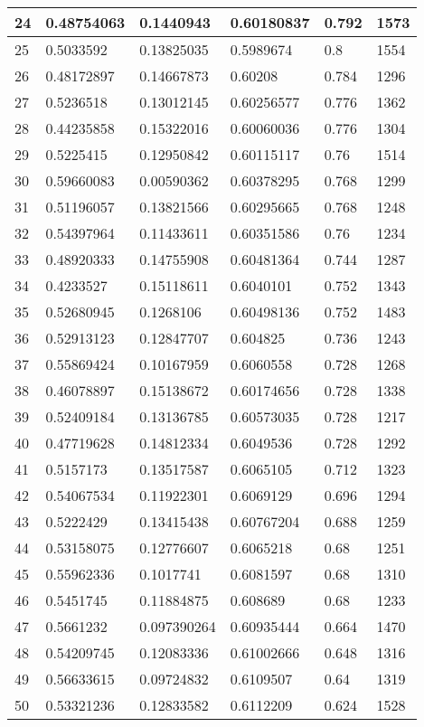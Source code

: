 \begin{longtable}{|l|l|l|l|l|l|}
24 & 0.48754063 & 0.1440943 & 0.60180837 & 0.792 & 1573 \\ \hline 
25 & 0.5033592 & 0.13825035 & 0.5989674 & 0.8 & 1554 \\ \hline 
26 & 0.48172897 & 0.14667873 & 0.60208 & 0.784 & 1296 \\ \hline 
27 & 0.5236518 & 0.13012145 & 0.60256577 & 0.776 & 1362 \\ \hline 
28 & 0.44235858 & 0.15322016 & 0.60060036 & 0.776 & 1304 \\ \hline 
29 & 0.5225415 & 0.12950842 & 0.60115117 & 0.76 & 1514 \\ \hline 
30 & 0.59660083 & 0.00590362 & 0.60378295 & 0.768 & 1299 \\ \hline 
31 & 0.51196057 & 0.13821566 & 0.60295665 & 0.768 & 1248 \\ \hline 
32 & 0.54397964 & 0.11433611 & 0.60351586 & 0.76 & 1234 \\ \hline 
33 & 0.48920333 & 0.14755908 & 0.60481364 & 0.744 & 1287 \\ \hline 
34 & 0.4233527 & 0.15118611 & 0.6040101 & 0.752 & 1343 \\ \hline 
35 & 0.52680945 & 0.1268106 & 0.60498136 & 0.752 & 1483 \\ \hline 
36 & 0.52913123 & 0.12847707 & 0.604825 & 0.736 & 1243 \\ \hline 
37 & 0.55869424 & 0.10167959 & 0.6060558 & 0.728 & 1268 \\ \hline 
38 & 0.46078897 & 0.15138672 & 0.60174656 & 0.728 & 1338 \\ \hline 
39 & 0.52409184 & 0.13136785 & 0.60573035 & 0.728 & 1217 \\ \hline 
40 & 0.47719628 & 0.14812334 & 0.6049536 & 0.728 & 1292 \\ \hline 
41 & 0.5157173 & 0.13517587 & 0.6065105 & 0.712 & 1323 \\ \hline 
42 & 0.54067534 & 0.11922301 & 0.6069129 & 0.696 & 1294 \\ \hline 
43 & 0.5222429 & 0.13415438 & 0.60767204 & 0.688 & 1259 \\ \hline 
44 & 0.53158075 & 0.12776607 & 0.6065218 & 0.68 & 1251 \\ \hline 
45 & 0.55962336 & 0.1017741 & 0.6081597 & 0.68 & 1310 \\ \hline 
46 & 0.5451745 & 0.11884875 & 0.608689 & 0.68 & 1233 \\ \hline 
47 & 0.5661232 & 0.097390264 & 0.60935444 & 0.664 & 1470 \\ \hline 
48 & 0.54209745 & 0.12083336 & 0.61002666 & 0.648 & 1316 \\ \hline 
49 & 0.56633615 & 0.09724832 & 0.6109507 & 0.64 & 1319 \\ \hline 
50 & 0.53321236 & 0.12833582 & 0.6112209 & 0.624 & 1528 \\ \hline 
\end{longtable}